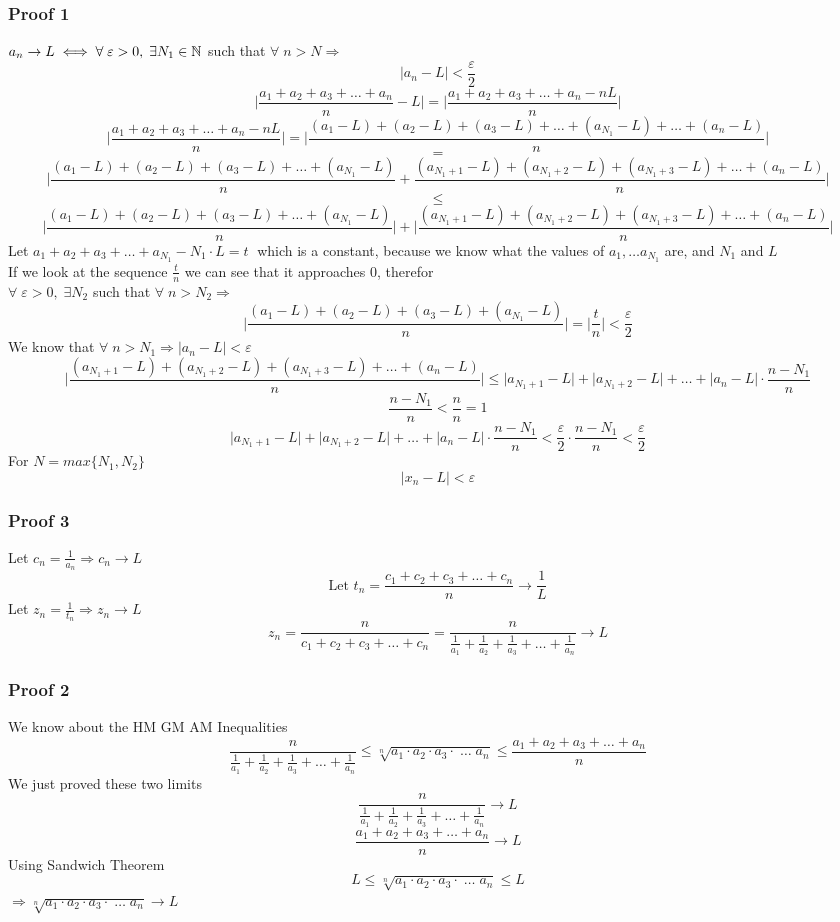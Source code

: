 \subsubsection{Proof 1}
$a_n\rightarrow L \iff \forall\; \varepsilon>0,\; \exists N_1\in \mathbb{N}$ such that $\forall\; n>N\Longrightarrow$
\[
    |a_n-L|<\frac{\varepsilon}{2}
\]
\[
    \big|\frac{a_1+a_2+a_3+\ldots+a_n}{n}-L \big| = \big|\frac{a_1+a_2+a_3+\ldots+a_n -nL}{n} \big| 
\]
\[
    \big|\frac{a_1+a_2+a_3+\ldots+a_n -nL}{n} \big| = \big|\frac{(a_1-L)+(a_2-L)+(a_3-L)+\ldots+(a_{N_1}-L)+\ldots+(a_n-L)}{n} \big|
\]
\[
    =
\]
\[
 \big|\frac{(a_1-L)+(a_2-L)+(a_3-L)+\ldots+(a_{N_1}-L)}{n}+\frac{(a_{N_1+1}-L)+(a_{N_1+2}-L)+(a_{N_1+3}-L)+\ldots+(a_n-L)}{n} \big|
\]
\[
    \leq
\]
\[
    \big|\frac{(a_1-L)+(a_2-L)+(a_3-L)+\ldots+(a_{N_1}-L)}{n}\big| + \big| \frac{(a_{N_1+1}-L)+(a_{N_1+2}-L)+(a_{N_1+3}-L)+\ldots+(a_n-L)}{n} \big|
\]
Let $a_1+a_2+a_3+\ldots+a_{N_1} - N_1\cdot L = t\;$ which is a constant, because we know what the values of $a_1,\ldots a_{N_1}$ are, and $N_1$ and $L$\\

If we look at the sequence $\frac{t}{n}$ we can see that it approaches $0$, therefor\\
$\forall\; \varepsilon>0,\; \exists N_2$ such that $\forall\; n>N_2 \Longrightarrow$
\[
    \big|\frac{(a_1-L)+(a_2-L)+(a_3-L)+(a_{N_1}-L)}{n}\big| = \big|\frac{t}{n} \big| <\frac{\varepsilon}{2} 
\]
We know that $\forall\; n>N_1 \Longrightarrow |a_n-L|<\varepsilon$ 
\[
    \big|\frac{(a_{N_1+1}-L)+(a_{N_1+2}-L)+(a_{N_1+3}-L)+\ldots+(a_n-L)}{n} \big|\leq \big|a_{N_1+1}-L\big| + \big|a_{N_1+2}-L\big| + \ldots + \big|a_n-L\big| \cdot \frac{n-N_1}{n}
\]
\[
    \frac{n-N_1}{n}<\frac{n}{n} = 1
\]
\[
    \big|a_{N_1+1}-L\big| + \big|a_{N_1+2}-L\big| + \ldots + \big|a_n-L\big| \cdot \frac{n-N_1}{n} < \frac{\varepsilon}{2}\cdot \frac{n-N_1}{n} <\frac{\varepsilon}{2}
\]
For $N = max\{N_1,N_2\}$
\[
    |x_n-L|<\varepsilon
\]
\subsubsection{Proof 3}
Let $c_n = \frac{1}{a_n} \Longrightarrow c_n\rightarrow L$
\[
    \text{Let } t_n = \frac{c_1+c_2+c_3+\ldots+c_n}{n} \rightarrow \frac{1}{L}
\]
Let $z_n = \frac{1}{t_n}\Longrightarrow z_n\rightarrow L$
\[
    z_n = \frac{n}{c_1+c_2+c_3+\ldots+c_n} = \frac{n}{\frac{1}{a_1}+\frac{1}{a_2}+\frac{1}{a_3}+\ldots+\frac{1}{a_n}}\rightarrow L
\]
\subsubsection{Proof 2}
We know about the HM GM AM Inequalities
\[
    \frac{n}{\frac{1}{a_1}+\frac{1}{a_2}+\frac{1}{a_3}+\ldots+\frac{1}{a_n}}\leq \sqrt[n]{a_1\cdot a_2\cdot a_3\cdot\; \ldots \; a_n} \leq \frac{a_1+a_2+a_3+\ldots+a_n}{n}
\]
We just proved these two limits
\[
    \frac{n}{\frac{1}{a_1}+\frac{1}{a_2}+\frac{1}{a_3}+\ldots+\frac{1}{a_n}} \rightarrow L
\]
\[
    \frac{a_1+a_2+a_3+\ldots+a_n}{n}\rightarrow L
\]
Using Sandwich Theorem
\[
    L\leq\sqrt[n]{a_1\cdot a_2\cdot a_3\cdot\; \ldots \; a_n}\leq L
\]
$\Longrightarrow \sqrt[n]{a_1\cdot a_2\cdot a_3\cdot\; \ldots \; a_n}\rightarrow L$
